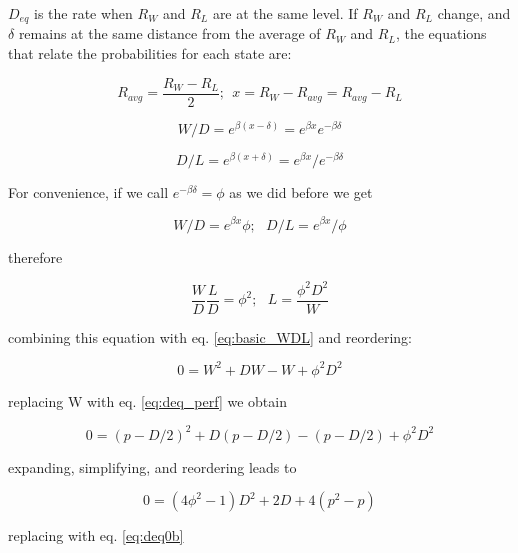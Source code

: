 \documentclass[12pt]{article}
\begin{document}
$D_{eq}$ is the rate when $R_{W}$ and $R_{L}$ are at the same level. 
If $R_{W}$ and $R_{L}$ change, and $\delta$ remains at the same distance from the average of $R_{W}$ and $R_{L}$, the equations that relate the probabilities for each state are:

	\begin{equation} \label{eq:deq1}
	R_{avg} = \frac{R_{W} - R_{L}}{2};\:\: x = R_{W} - R_{avg} =  R_{avg} - R_{L}
	\end{equation}

	\begin{equation} \label{eq:deq2}
	W/D = e^{\beta(x-\delta)} =  e^{\beta x} e^{-\beta \delta}
	\end{equation}

	\begin{equation} \label{eq:deq3}
	D/L = e^{\beta(x+\delta)} =  e^{\beta x} / e^{-\beta \delta}
	\end{equation}


For convenience, if we call $e^{-\beta \delta} = \phi$ as we did before we get

	\begin{equation} \label{eq:deq4}
	W/D = e^{\beta x} \phi;\:\:\:
	D/L = e^{\beta x} / \phi
	\end{equation}

therefore

	\begin{equation} \label{eq:deq_wldd}
	\frac{W}{D} \frac{L}{D} = \phi^2; \:\:\: L = \frac{\phi^2 D^2}{W}
	\end{equation}

combining this equation with eq. \ref{eq:basic_WDL} and reordering: 

	\begin{equation} \label{eq:deq7}
	0 = W^2 + D W - W + \phi^2 D^2
	\end{equation}

replacing W with eq. \ref{eq:deq_perf} we obtain

	\begin{equation} \label{eq:deq9}
	0 = (p - D/2)^2 + D (p - D/2) - (p - D/2) + \phi^2 D^2
	\end{equation}

expanding, simplifying, and reordering leads to

	\begin{equation} \label{eq:deq10}
	0 = (4 \phi^2 -1) D^2 + 2 D + 4 (p^2 - p)
	\end{equation}

replacing with eq. \ref{eq:deq0b}
\end{document}
